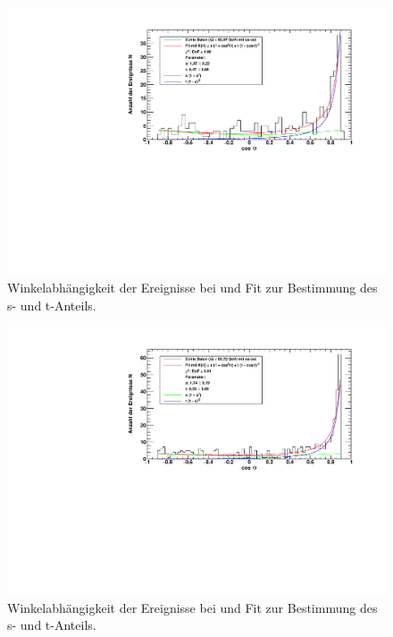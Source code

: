 \begin{figure}[H]
    \begin{center}
        \includegraphics[width=\textwidth]{../img/s_t_fit_92-97.pdf}
        \caption{Winkelabhängigkeit der Ereignisse bei  und Fit zur Bestimmung des s- und t-Anteils.}
        \label{img:st:9297}
    \end{center}
\end{figure}

\begin{figure}[H]
    \begin{center}
        \includegraphics[width=\textwidth]{../img/s_t_fit_93-72.pdf}
        \caption{Winkelabhängigkeit der Ereignisse bei  und Fit zur Bestimmung des s- und t-Anteils.}
        \label{img:st:9372}
    \end{center}
\end{figure}
